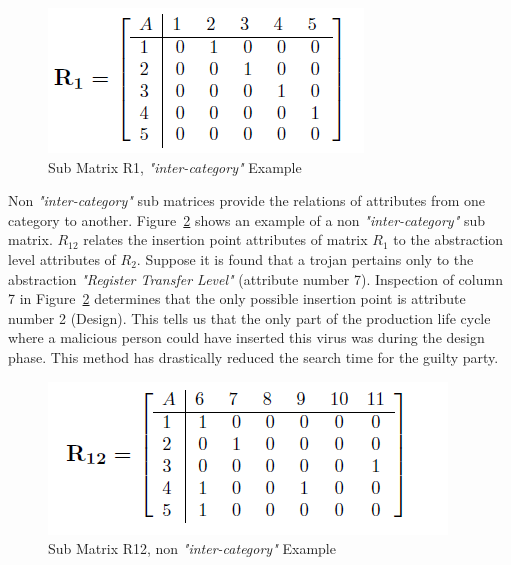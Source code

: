 \begin{figure}[h]
	\centering
	\includegraphics[width=0.45\linewidth]{figures/R1}
	\caption[Sub Matrix R1, \textit{"inter-category"} Example]{Sub Matrix R1, \textit{"inter-category"} Example}
	\label{fig:R1}
\end{figure}

Non \textit{"inter-category"} sub matrices provide the relations of attributes from one category to another. Figure~\ref{fig:R12} shows an example of a non \textit{"inter-category"} sub matrix. $R_{12}$ relates the insertion point attributes of matrix $R_{1}$ to the abstraction level attributes of $R_{2}$. Suppose it is found that a trojan pertains only to the abstraction \textit{"Register Transfer Level"} (attribute number 7). Inspection of column 7 in Figure~\ref{fig:R12} determines that the only possible insertion point is attribute number 2 (Design). This tells us that the only part of the production life cycle where a malicious person could have inserted this virus was during the design phase. This method has drastically reduced the search time for the guilty party.

\begin{figure}
	\centering
	\includegraphics[width=0.5\linewidth]{figures/R12}
	\caption[Sub Matrix R12, non \textit{"inter-category"} Example]{Sub Matrix R12, non \textit{"inter-category"} Example}
	\label{fig:R12}
\end{figure}

